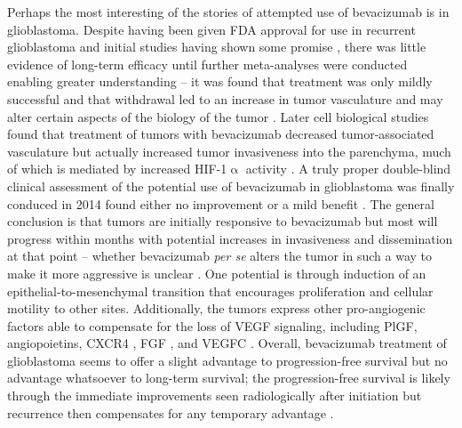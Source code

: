 Perhaps the most interesting of the stories of attempted use of bevacizumab is in glioblastoma. Despite having been given FDA approval for use in recurrent glioblastoma and initial studies having shown some promise \citep{Segerstrom2006}, there was little evidence of long\hyp{}term efficacy until further meta\hyp{}analyses were conducted enabling greater understanding -- it was found that treatment was only mildly successful and that withdrawal led to an increase in tumor vasculature and may alter certain aspects of the biology of the tumor \citep{Iwamoto2009}. Later cell biological studies found that treatment of tumors with bevacizumab decreased tumor\hyp{}associated vasculature but actually increased tumor invasiveness into the parenchyma, much of which is mediated by increased HIF\hyp{}1$\upalpha$ activity \citep{Keunen2011}. A truly proper double\hyp{}blind clinical assessment of the potential use of bevacizumab in glioblastoma was finally conduced in 2014 found either no improvement \citep{Gilbert2014} or a mild benefit \citep{Chinot2014}. The general conclusion is that tumors are initially responsive to bevacizumab but most will progress within months with potential increases in invasiveness and dissemination at that point -- whether bevacizumab \textit{per se} alters the tumor in such a way to make it more aggressive is unclear \citep{Li2017}. One potential is through induction of an epithelial\hyp{}to\hyp{}mesenchymal transition that encourages proliferation and cellular motility to other sites. Additionally, the tumors express other pro\hyp{}angiogenic factors able to compensate for the loss of VEGF signaling, including PlGF, angiopoietins, CXCR4 \citep{Xu2009a}, FGF \citep{Tamura2017}, and VEGFC \citep{Michaelsen2018, Villefranc2013, Zhao2017}. Overall, bevacizumab treatment of glioblastoma seems to offer a slight advantage to progression\hyp{}free survival but no advantage whatsoever to long\hyp{}term survival; the progression\hyp{}free survival is likely through the immediate improvements seen radiologically after initiation but recurrence then compensates for any temporary advantage \citep{Wick2017, Zhan2019}. 

